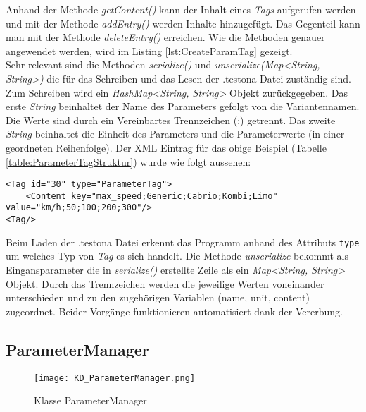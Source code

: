 Anhand der Methode \textit{getContent()} kann der Inhalt eines \textit{Tags} aufgerufen werden und mit der Methode \textit{addEntry()} werden Inhalte hinzugefügt. Das Gegenteil kann man mit der Methode \textit{deleteEntry()} erreichen. Wie die Methoden genauer angewendet werden, wird im Listing \ref{lst:CreateParamTag} gezeigt.\\


Sehr relevant sind die Methoden \textit{serialize()} und \textit{unserialize(Map<String, String>)} die für das Schreiben und das Lesen der .testona Datei zuständig sind. Zum Schreiben wird ein \textit{HashMap<String, String>} Objekt zurückgegeben. Das erste \textit{String} beinhaltet der Name des Parameters gefolgt von die Variantennamen. Die Werte sind durch ein Vereinbartes Trennzeichen (;)  getrennt. Das zweite \textit{String} beinhaltet die Einheit des Parameters und die Parameterwerte (in einer geordneten Reihenfolge). Der XML Eintrag für das obige Beispiel (Tabelle \ref{table:ParameterTagStruktur}) wurde wie folgt aussehen:\\

\begin{lstlisting}[caption={XML Darstellung eines ParameterTags}, captionpos=b]
<Tag id="30" type="ParameterTag">
	<Content key="max_speed;Generic;Cabrio;Kombi;Limo" value="km/h;50;100;200;300"/>
<Tag/>
\end{lstlisting}


Beim Laden der .testona Datei erkennt das Programm anhand des Attributs \texttt{type} um welches Typ von \textit{Tag} es sich handelt. Die Methode \textit{unserialize} bekommt als Eingansparameter die in \textit{serialize()} erstellte Zeile als ein \textit{Map<String, String>} Objekt. Durch das Trennzeichen werden die jeweilige Werten voneinander unterschieden und zu den zugehörigen Variablen (name, unit, content) zugeordnet. Beider Vorgänge funktionieren automatisiert dank der Vererbung.

\subsection{ParameterManager}\label{sub:ParameterManager}

\begin{figure}[h!]
  \begin{center}
    \texttt{[image: KD\_ParameterManager.png]}
  		  \caption{Klasse ParameterManager}
     \label{kd.ParameterMananger}
  \end{center}
\end{figure}

